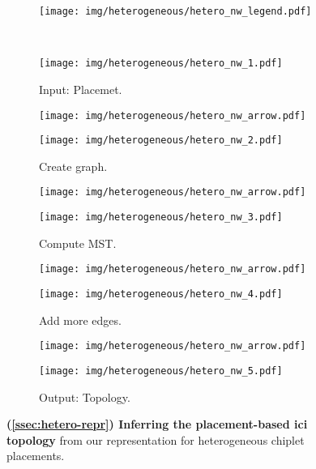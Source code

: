 \begin{figure*}[h]
\centering
\captionsetup{justification=centering}
%
\begin{subfigure}{0.94 \textwidth}
\centering
\texttt{[image: img/heterogeneous/hetero\_nw\_legend.pdf]}
\vspace{-1.0em}
\end{subfigure}
%
\\
%
\begin{subfigure}{0.16 \textwidth}
\centering
\texttt{[image: img/heterogeneous/hetero\_nw\_1.pdf]}
\caption{Input: Placemet.}
\label{fig:hetero-nw-1}
\end{subfigure}
%
\begin{subfigure}{0.025\textwidth}
\centering
\texttt{[image: img/heterogeneous/hetero\_nw\_arrow.pdf]}
\vspace{0.9em}
\end{subfigure}
%
\begin{subfigure}{0.16 \textwidth}
\centering
\texttt{[image: img/heterogeneous/hetero\_nw\_2.pdf]}
\caption{Create graph.}
\label{fig:hetero-nw-2}
\end{subfigure}
%
\begin{subfigure}{0.025\textwidth}
\centering
\texttt{[image: img/heterogeneous/hetero\_nw\_arrow.pdf]}
\vspace{0.9em}
\end{subfigure}
%
\begin{subfigure}{0.16 \textwidth}
\centering
\texttt{[image: img/heterogeneous/hetero\_nw\_3.pdf]}
\caption{Compute MST.}
\label{fig:hetero-nw-3}
\end{subfigure}
%
\begin{subfigure}{0.025\textwidth}
\centering
\texttt{[image: img/heterogeneous/hetero\_nw\_arrow.pdf]}
\vspace{0.9em}
\end{subfigure}
%
\begin{subfigure}{0.16 \textwidth}
\centering
\texttt{[image: img/heterogeneous/hetero\_nw\_4.pdf]}
\caption{Add more edges.}
\label{fig:hetero-nw-4}
\end{subfigure}
%
\begin{subfigure}{0.025\textwidth}
\centering
\texttt{[image: img/heterogeneous/hetero\_nw\_arrow.pdf]}
\vspace{0.9em}
\end{subfigure}
%
\begin{subfigure}{0.16 \textwidth}
\centering
\texttt{[image: img/heterogeneous/hetero\_nw\_5.pdf]}
\caption{Output: Topology.}
\label{fig:hetero-nw-5}
\end{subfigure}
%
\caption{\textbf{(\textsection \ref{ssec:hetero-repr}) Inferring the placement-based \gls{ici} topology} from our representation for heterogeneous chiplet placements.}
\label{fig:hetero-nw}
\end{figure*}
